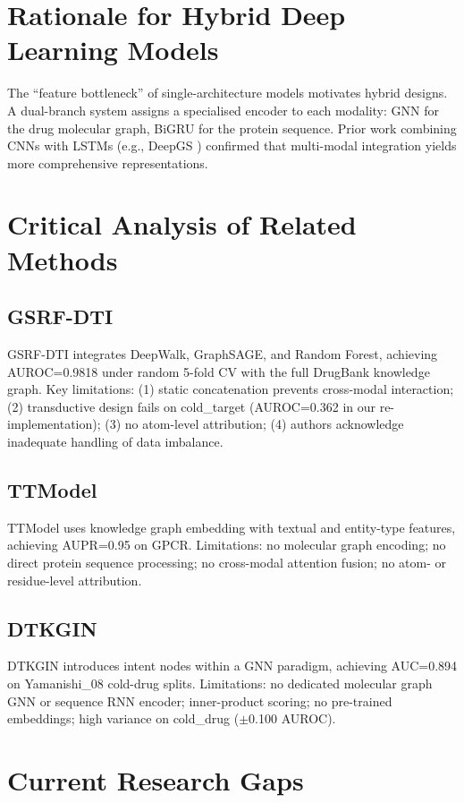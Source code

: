 \documentclass[12pt,a4paper,oneside]{report}
\begin{document}
\section{Rationale for Hybrid Deep Learning Models}

The ``feature bottleneck'' of single-architecture models motivates hybrid designs. A dual-branch system assigns a specialised encoder to each modality: GNN for the drug molecular graph, BiGRU for the protein sequence. Prior work combining CNNs with LSTMs (e.g., DeepGS \citealt{zhijian2022}) confirmed that multi-modal integration yields more comprehensive representations.

\section{Critical Analysis of Related Methods}

\subsection{GSRF-DTI \citep{zhu2024}}
GSRF-DTI integrates DeepWalk, GraphSAGE, and Random Forest, achieving AUROC=0.9818 under random 5-fold CV with the full DrugBank knowledge graph. Key limitations: (1) static concatenation prevents cross-modal interaction; (2) transductive design fails on cold\_target (AUROC=0.362 in our re-implementation); (3) no atom-level attribution; (4) authors acknowledge inadequate handling of data imbalance.

\subsection{TTModel \citep{li2024ttmodel}}
TTModel uses knowledge graph embedding with textual and entity-type features, achieving AUPR=0.95 on GPCR. Limitations: no molecular graph encoding; no direct protein sequence processing; no cross-modal attention fusion; no atom- or residue-level attribution.

\subsection{DTKGIN \citep{luo2024dtkgin}}
DTKGIN introduces intent nodes within a GNN paradigm, achieving AUC=0.894 on Yamanishi\_08 cold-drug splits. Limitations: no dedicated molecular graph GNN or sequence RNN encoder; inner-product scoring; no pre-trained embeddings; high variance on cold\_drug ($\pm$0.100 AUROC).

\section{Current Research Gaps}
\end{document}

